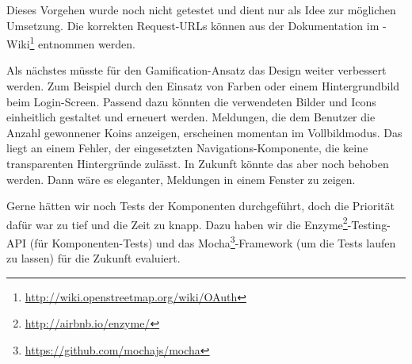 Dieses Vorgehen wurde noch nicht getestet und dient nur als Idee zur möglichen Umsetzung.
Die korrekten Request-URLs können aus der Dokumentation im -Wiki\footnote{\url{http://wiki.openstreetmap.org/wiki/OAuth}} entnommen werden.




Als nächstes müsste für den \gls{Gamification}-Ansatz das Design weiter verbessert werden. 
Zum Beispiel durch den Einsatz von Farben oder einem Hintergrundbild beim Login-Screen. 
Passend dazu könnten die verwendeten Bilder und Icons einheitlich gestaltet und erneuert werden. 
Meldungen, die dem Benutzer die Anzahl gewonnener Koins anzeigen, erscheinen momentan im Vollbildmodus. 
Das liegt an einem Fehler, der eingesetzten Navigations-Komponente, die keine transparenten Hintergründe zulässt. 
In Zukunft könnte das aber noch behoben werden. 
Dann wäre es eleganter, Meldungen in einem Fenster zu zeigen.

Gerne hätten wir noch Tests der Komponenten durchgeführt, doch die Priorität dafür war zu tief und die Zeit zu knapp. 
Dazu haben wir die Enzyme\footnote{\url{http://airbnb.io/enzyme/}}-Testing-API (für Komponenten-Tests) und das Mocha\footnote{\url{https://github.com/mochajs/mocha}}-\gls{Framework} (um die Tests laufen zu lassen) für die Zukunft evaluiert.
